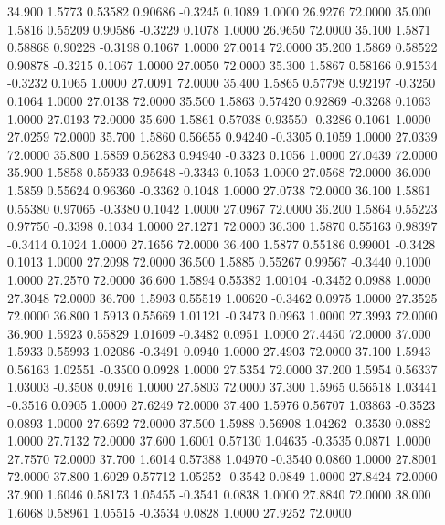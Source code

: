   34.900   1.5773   0.53582   0.90686  -0.3245   0.1089   1.0000  26.9276  72.0000
  35.000   1.5816   0.55209   0.90586  -0.3229   0.1078   1.0000  26.9650  72.0000
  35.100   1.5871   0.58868   0.90228  -0.3198   0.1067   1.0000  27.0014  72.0000
  35.200   1.5869   0.58522   0.90878  -0.3215   0.1067   1.0000  27.0050  72.0000
  35.300   1.5867   0.58166   0.91534  -0.3232   0.1065   1.0000  27.0091  72.0000
  35.400   1.5865   0.57798   0.92197  -0.3250   0.1064   1.0000  27.0138  72.0000
  35.500   1.5863   0.57420   0.92869  -0.3268   0.1063   1.0000  27.0193  72.0000
  35.600   1.5861   0.57038   0.93550  -0.3286   0.1061   1.0000  27.0259  72.0000
  35.700   1.5860   0.56655   0.94240  -0.3305   0.1059   1.0000  27.0339  72.0000
  35.800   1.5859   0.56283   0.94940  -0.3323   0.1056   1.0000  27.0439  72.0000
  35.900   1.5858   0.55933   0.95648  -0.3343   0.1053   1.0000  27.0568  72.0000
  36.000   1.5859   0.55624   0.96360  -0.3362   0.1048   1.0000  27.0738  72.0000
  36.100   1.5861   0.55380   0.97065  -0.3380   0.1042   1.0000  27.0967  72.0000
  36.200   1.5864   0.55223   0.97750  -0.3398   0.1034   1.0000  27.1271  72.0000
  36.300   1.5870   0.55163   0.98397  -0.3414   0.1024   1.0000  27.1656  72.0000
  36.400   1.5877   0.55186   0.99001  -0.3428   0.1013   1.0000  27.2098  72.0000
  36.500   1.5885   0.55267   0.99567  -0.3440   0.1000   1.0000  27.2570  72.0000
  36.600   1.5894   0.55382   1.00104  -0.3452   0.0988   1.0000  27.3048  72.0000
  36.700   1.5903   0.55519   1.00620  -0.3462   0.0975   1.0000  27.3525  72.0000
  36.800   1.5913   0.55669   1.01121  -0.3473   0.0963   1.0000  27.3993  72.0000
  36.900   1.5923   0.55829   1.01609  -0.3482   0.0951   1.0000  27.4450  72.0000
  37.000   1.5933   0.55993   1.02086  -0.3491   0.0940   1.0000  27.4903  72.0000
  37.100   1.5943   0.56163   1.02551  -0.3500   0.0928   1.0000  27.5354  72.0000
  37.200   1.5954   0.56337   1.03003  -0.3508   0.0916   1.0000  27.5803  72.0000
  37.300   1.5965   0.56518   1.03441  -0.3516   0.0905   1.0000  27.6249  72.0000
  37.400   1.5976   0.56707   1.03863  -0.3523   0.0893   1.0000  27.6692  72.0000
  37.500   1.5988   0.56908   1.04262  -0.3530   0.0882   1.0000  27.7132  72.0000
  37.600   1.6001   0.57130   1.04635  -0.3535   0.0871   1.0000  27.7570  72.0000
  37.700   1.6014   0.57388   1.04970  -0.3540   0.0860   1.0000  27.8001  72.0000
  37.800   1.6029   0.57712   1.05252  -0.3542   0.0849   1.0000  27.8424  72.0000
  37.900   1.6046   0.58173   1.05455  -0.3541   0.0838   1.0000  27.8840  72.0000
  38.000   1.6068   0.58961   1.05515  -0.3534   0.0828   1.0000  27.9252  72.0000
